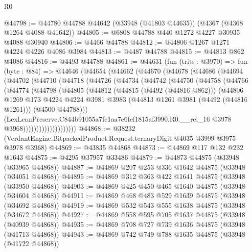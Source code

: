 \begin{lexlean}{R0}
\begin{coremodule}
@44798 := @44780 @44788 @44642 (@33948 (@41803 @44635)) (@4367 (@4368 @1264 @4088 @41642))
@44805 := @6808 @44788 @440 @1272 @4227 @30935 @4088 @30940
@44806 := @4466 @44788
@44812 := @44806 @1267 @1271 @4224 @4226 @4086 @3984
@44813 := @4487 @44788
@44815 := @44813 @862 @4086
@44816 := @4493 @44788
@44861 := @44631
    (fun (trits : @3970) =>
    fun (byte : @84) =>
    @44646
      (@44654
        (@44662
          (@44670
            (@44678
              (@44686
                (@44694
                  (@44702
                    (@44710
                      (@44718
                        (@44726
                          (@44734
                            (@44742
                              (@44750
                                (@44758
                                  (@44766
                                    (@44774
                                      (@44798
                                        (@44805
                                          (@44812
                                            (@44815 (@4492 (@44816 @862)))
                                            (@44806
                                              @1269
                                              @173
                                              @4224
                                              @4224
                                              @3981
                                              @3983
                                              (@44813 @1261 @3981 (@4492 (@44816 @1261)))
                                              (@4500 @44788)))
                                          (LexLeanPreserve.C844b91055a7fc1aa7e6fef1815af3990.R0.__rel_16
                                            @3978
                                            @3968))))))))))))))))))))
@44868 := @38232 (VerdantEngine.BitpackedProduct.Request.ternaryDigit @4035 @3999 @3975 @3978 @3968)
@44869 := @43835 @44868
@44873 := @44869 @117 @132 @232 @1643
@44875 := @4295 @37957 @33486
@44879 := @44873 @44875 (@33948 (@33965 @44868))
@44887 := @44869 @207 @253 @336 @1642 @44875 (@33948 (@34051 @44868))
@44895 := @44869 @312 @363 @422 @1641 @44875 (@33948 (@33950 @44868))
@44903 := @44869 @425 @450 @465 @1640 @44875 (@33948 (@34604 @44868))
@44911 := @44869 @468 @483 @529 @1639 @44875 (@33948 (@34692 @44868))
@44919 := @44869 @532 @543 @555 @1638 @44875 (@33948 (@34672 @44868))
@44927 := @44869 @558 @595 @705 @1637 @44875 (@33948 (@40939 @44868))
@44935 := @44869 @708 @727 @739 @1636 @44875 (@33948 (@41713 @44868))
@44943 := @44869 @742 @749 @788 @1635 @44875 (@33948 (@41722 @44868))

\end{coremodule}
\end{lexlean}
